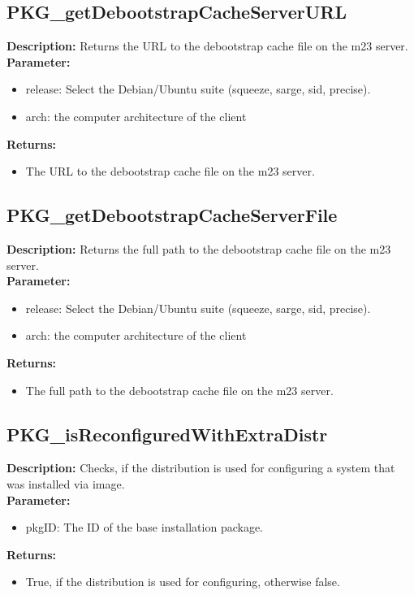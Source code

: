 \subsection{PKG\_getDebootstrapCacheServerURL}
\textbf{Description:} Returns the URL to the debootstrap cache file on the m23 server.\\
\textbf{Parameter:}
\begin{itemize}
\item release: Select the Debian/Ubuntu suite (squeeze, sarge, sid, precise).
\item arch: the computer architecture of the client
\end{itemize}
\textbf{Returns:}
\begin{itemize}
\item The URL to the debootstrap cache file on the m23 server.
\end{itemize}

\subsection{PKG\_getDebootstrapCacheServerFile}
\textbf{Description:} Returns the full path to the debootstrap cache file on the m23 server.\\
\textbf{Parameter:}
\begin{itemize}
\item release: Select the Debian/Ubuntu suite (squeeze, sarge, sid, precise).
\item arch: the computer architecture of the client
\end{itemize}
\textbf{Returns:}
\begin{itemize}
\item The full path to the debootstrap cache file on the m23 server.
\end{itemize}

\subsection{PKG\_isReconfiguredWithExtraDistr}
\textbf{Description:} Checks, if the distribution is used for configuring a system that was installed via image.\\
\textbf{Parameter:}
\begin{itemize}
\item pkgID: The ID of the base installation package.
\end{itemize}
\textbf{Returns:}
\begin{itemize}
\item True, if the distribution is used for configuring, otherwise false.
\end{itemize}

